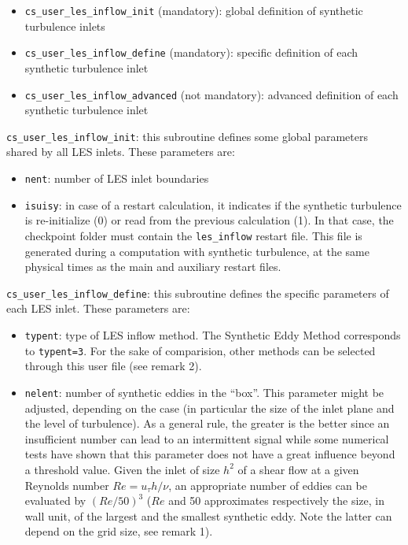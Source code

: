 {{{\begin{itemize}
\item \texttt{cs\_user\_les\_inflow\_init} (mandatory): global definition
  of synthetic turbulence inlets
\item \texttt{cs\_user\_les\_inflow\_define} (mandatory): specific
  definition of each synthetic turbulence inlet
\item \texttt{cs\_user\_les\_inflow\_advanced} (not mandatory): advanced
  definition of each synthetic turbulence inlet
\end{itemize}

\texttt{cs\_user\_les\_inflow\_init}: this subroutine defines
some global parameters shared by all LES inlets. These parameters are:

\begin{itemize}
\item \texttt{nent}: number of LES inlet boundaries
\item \texttt{isuisy}: in case of a restart calculation, it indicates if
  the synthetic turbulence is re-initialize (0) or read from the
  previous calculation (1). In that case, the checkpoint folder must
  contain the \texttt{les\_inflow} restart file. This file is
  generated during a computation with synthetic turbulence, at the
  same physical times as the main and auxiliary restart files.
\end{itemize}

\texttt{cs\_user\_les\_inflow\_define}: this subroutine defines
the specific parameters of each LES inlet. These parameters are:

\begin{itemize}
\item \texttt{typent}: type of LES inflow method. The Synthetic Eddy
  Method corresponds to \texttt{typent=3}. For the sake of
  comparision, other methods can be selected through this user file
  (see remark 2).

\item \texttt{nelent}: number of synthetic eddies in the ``box''. This
  parameter might be adjusted, depending on the case (in particular
  the size of the inlet plane and the level of turbulence). As a
  general rule, the greater is the better since an insufficient number
  can lead to an intermittent signal while some numerical tests have
  shown that this parameter does not have a great influence beyond a
  threshold value. Given the inlet of size $h^2$ of a shear flow at a
  given Reynolds number $Re=u_\tau h/\nu$, an appropriate number of
  eddies can be evaluated by $(Re/50)^3$ ($Re$ and 50 approximates
  respectively the size, in wall unit, of the largest and the smallest
  synthetic eddy. Note the latter can depend on the grid size, see
  remark 1).


\end{itemize}}}}

